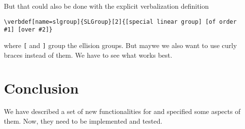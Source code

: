 \documentclass{bluenote}
\begin{document}
But that could also be done with the explicit verbalization definition
\begin{lstlisting}
\verbdef[name=slgroup]{SLGroup}[2]{[special linear group] [of order #1] [over #2]}
\end{lstlisting}
where \lstinline|[| and \lstinline|]| group the ellision groups. But maywe we also want to
use curly braces instead of them. We have to see what works best. 


\section{Conclusion}
We have described a set of new functionalities for \sTeX and specified some aspects of
them. Now, they need to be implemented and tested. 

\printbibliography
\end{document}
